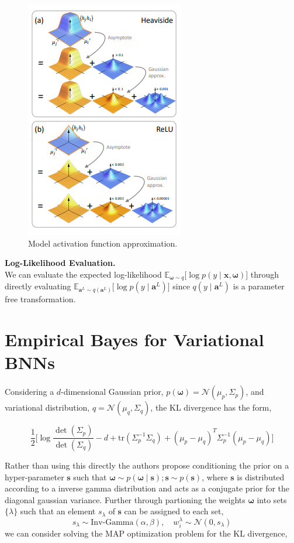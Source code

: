 \begin{figure}[H]
\centering
\includegraphics[scale=.5]{fig/activations.png}
\caption{Model activation function approximation.}
\label{fig:approx}
\end{figure}

\noindent\textbf{Log-Likelihood Evaluation.} \\
We can evaluate the expected log-likelihood $\mathbb{E}_{\bm{\omega}\sim q}\big[\log p(y \mid \bm{x},\bm{\omega})\big]$ through directly evaluating $\mathbb{E}_{\bm{a}^L\sim q(\bm{a}^L)}\big[\log p(y \mid \bm{a}^L)\big]$ since $q(y \mid \bm{a}^L)$ is a parameter free transformation.

\section{Empirical Bayes for Variational BNNs}

Considering a $d$-dimensional Gaussian prior, $p(\bm{\omega}) = \mathcal{N}(\mu_p,\Sigma_p)$, and variational distribution, $q = \mathcal{N}(\mu_q,\Sigma_q)$, the KL divergence has the form,

\begin{equation}
\frac{1}{2}\bigg[\log\frac{\det(\Sigma_p)}{\det(\Sigma_q)} - d + \text{tr}(\Sigma_p^{-1}\Sigma_q) + (\mu_p - \mu_q)^T\Sigma_p^{-1}(\mu_p - \mu_q)\bigg]
\end{equation}

Rather than using this directly the authors propose conditioning the prior on a hyper-parameter $\bm{s}$ such that $\bm{\omega}\sim p(\bm{\omega}\mid\bm{s}); \bm{s} \sim p(\bm{s})$, where $\bm{s}$ is distributed according to a inverse gamma distribution and acts as a conjugate prior for the diagonal gaussian variance. Further through partioning the weights $\bm{\omega}$ into sets $\{\lambda\}$ such that an element $s_\lambda$ of $\bm{s}$ can be assigned to each set,
$$
s_\lambda \sim \text{Inv-Gamma}(\alpha,\beta), \quad w_i^\lambda \sim \mathcal{N}(0,s_\lambda) 
$$
we can consider solving the MAP optimization problem for the KL divergence,

